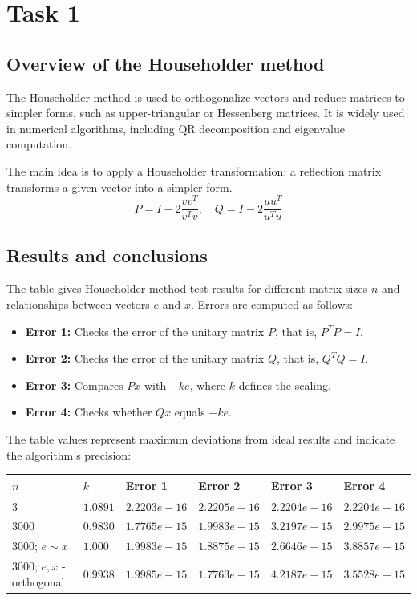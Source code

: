\section{Task 1}

\subsection{Overview of the Householder method}

The Householder method is used to orthogonalize vectors and reduce matrices to simpler forms, such as upper-triangular or Hessenberg matrices. It is widely used in numerical algorithms, including QR decomposition and eigenvalue computation.

The main idea is to apply a Householder transformation: a reflection matrix transforms a given vector into a simpler form.
\[
P = I - 2 \frac{v v^T}{v^T v}, \quad Q = I - 2\frac{uu^T}{u^Tu}
\]


\subsection{Results and conclusions}

The table gives Householder-method test results for different matrix sizes \( n \) and relationships between vectors \( e \) and \( x \). Errors are computed as follows:
\begin{itemize}
\item \textbf{Error 1:} Checks the error of the unitary matrix \( P \), that is, \( P^T P = I \).
\item \textbf{Error 2:} Checks the error of the unitary matrix \( Q \), that is, \( Q^T Q = I \).
\item \textbf{Error 3:} Compares \( P x \) with \(-k e\), where \( k \) defines the scaling.
\item \textbf{Error 4:} Checks whether \( Q x \) equals \(-k e\).
\end{itemize}
The table values represent maximum deviations from ideal results and indicate the algorithm's precision:

\begin{center}
\begin{tabular}{@{}|l|l|l|l|l|l|@{}}
\hline
$n$                        & $k$       & Error 1       & Error 2       & Error 3       & Error 4       \\ \hline
$3$                        & $1.0891$  & $2.2203e-16$ & $2.2205e-16$ & $2.2204e-16$ & $2.2204e-16$ \\ \hline
$3000$                     & $0.9830$  & $1.7765e-15$ & $1.9983e-15$ & $3.2197e-15$ & $2.9975e-15$ \\ \hline
$3000$; $e \sim x$         & $1.000$   & $1.9983e-15$ & $1.8875e-15$ & $2.6646e-15$ & $3.8857e-15$ \\ \hline
$3000$; $e, x$ - orthogonal & $0.9938$ & $1.9985e-15$ & $1.7763e-15$ & $4.2187e-15$ & $3.5528e-15$ \\ \hline
\end{tabular}
\end{center}

